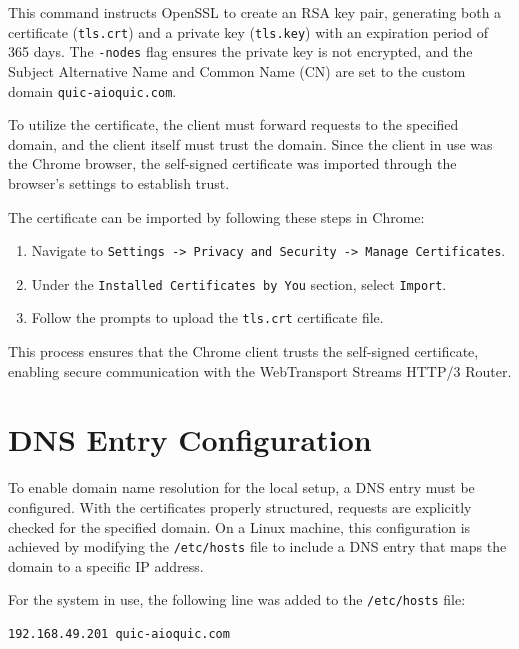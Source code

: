 This command instructs OpenSSL to create an RSA key pair, generating both a certificate (\texttt{tls.crt}) and a private key (\texttt{tls.key}) with an expiration period of 365 days. The \texttt{-nodes} flag ensures the private key is not encrypted, and the Subject Alternative Name and Common Name (CN) are set to the custom domain \texttt{quic-aioquic.com}.

To utilize the certificate, the client must forward requests to the specified domain, and the client itself must trust the domain. Since the client in use was the Chrome browser, the self-signed certificate was imported through the browser's settings to establish trust.

The certificate can be imported by following these steps in Chrome:

\begin{enumerate}
    \item Navigate to \texttt{Settings -> Privacy and Security -> Manage Certificates}.
    \item Under the \texttt{Installed Certificates by You} section, select \texttt{Import}.
    \item Follow the prompts to upload the \texttt{tls.crt} certificate file.
\end{enumerate}

This process ensures that the Chrome client trusts the self-signed certificate, enabling secure communication with the WebTransport Streams HTTP/3 Router.


\section{DNS Entry Configuration}
To enable domain name resolution for the local setup, a DNS entry must be configured. With the certificates properly structured, requests are explicitly checked for the specified domain. On a Linux machine, this configuration is achieved by modifying the \texttt{/etc/hosts} file to include a DNS entry that maps the domain to a specific IP address.

For the system in use, the following line was added to the \texttt{/etc/hosts} file:

\begin{lstlisting}[breaklines=true,basicstyle=\small\ttfamily,frame=single]
192.168.49.201 quic-aioquic.com
\end{lstlisting}

